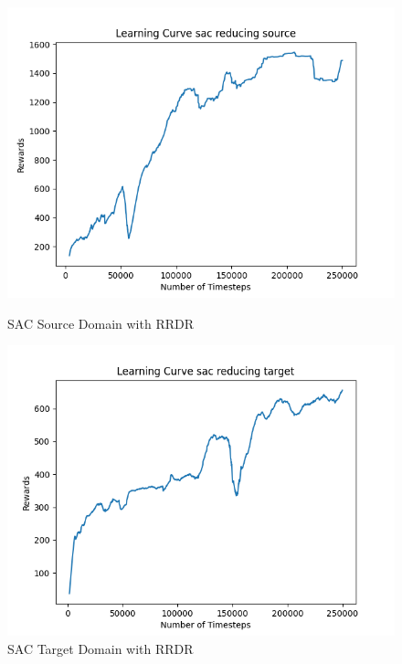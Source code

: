 \documentclass[11pt]{article}
\begin{document}
\begin{figure}[H]
    \centering
    \begin{minipage}{0.45\textwidth}
        \centering
        \includegraphics[width=\textwidth]{../images/Learning_Curve_SAC_Reducing_Source.png}
        \caption{SAC Source Domain with RRDR}
        \label{fig:sac_source_rrdr}
    \end{minipage}
    \hfill
    \begin{minipage}{0.45\textwidth}
        \centering
        \includegraphics[width=\textwidth]{../images/Learning_Curve_SAC_Reducing_Target.png}
        \caption{SAC Target Domain with RRDR}
        \label{fig:sac_target_rrdr}
    \end{minipage}

\end{figure}
\end{document}
